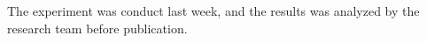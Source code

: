 The experiment was conduct last week, and the results was analyzed by the research team before publication.
